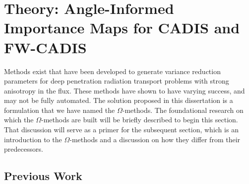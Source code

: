 \section{Theory: Angle-Informed Importance Maps for CADIS and FW-CADIS}
\label{sec:methodtheory}

Methods exist that have been developed to generate
variance reduction parameters
for deep penetration radiation transport problems with strong anisotropy in the
flux. These methods have shown to have varying success, and may not be fully
automated. The solution proposed in this dissertation is a formulation that we
have named the $\Omega$-methods. 
The foundational research
on which the $\Omega$-methods are built will be briefly described to begin this
section. That discussion will serve as a primer for the subsequent section, which
is an introduction to the $\Omega$-methods and a discussion on how they differ
from their predecessors.

\subsection{Previous Work}
\label{sec:omegabknd}

